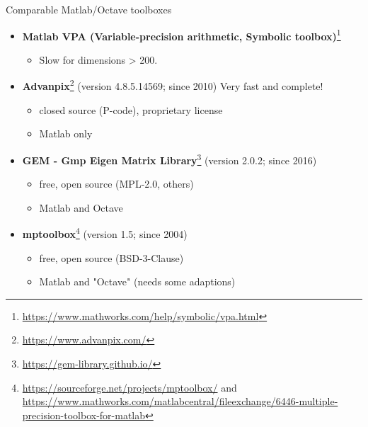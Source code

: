 \begin{frame}{Comparable Matlab/Octave toolboxes}

\begin{itemize}\itemsep0.5em

\item
\textbf{Matlab VPA (Variable-precision arithmetic,
Symbolic toolbox)}\footnote{\tiny
\url{https://www.mathworks.com/help/symbolic/vpa.html}}
\begin{itemize}
\item
Slow for dimensions > 200.
\end{itemize}

\item
\textbf{Advanpix}\footnote{\tiny
\url{https://www.advanpix.com/}}
(version 4.8.5.14569; since 2010)
{\color{red} Very fast and complete!}
\begin{itemize}
\item
{\color{blue} closed source} (P-code), proprietary license

\item
Matlab only
\end{itemize}

\item
\textbf{GEM - Gmp Eigen Matrix Library}\footnote{\tiny
\url{https://gem-library.github.io/}}
(version 2.0.2; since 2016)
\begin{itemize}
\item
free, open source (MPL-2.0, others)

\item
Matlab and Octave
\end{itemize}

\item
\textbf{mptoolbox}\footnote{\tiny
\url{https://sourceforge.net/projects/mptoolbox/}
and
\url{https://www.mathworks.com/matlabcentral/fileexchange/6446-multiple-precision-toolbox-for-matlab}}
(version 1.5; since 2004)
\begin{itemize}
\item
free, open source (BSD-3-Clause)

\item
Matlab and "Octave" (needs some adaptions)
\end{itemize}

\end{itemize}

\end{frame}
